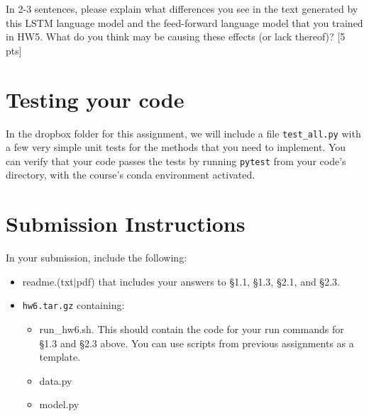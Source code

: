 \documentclass[11pt]{article}
\begin{document}
\vspace{2em}
 In 2-3 sentences, please explain what differences you see in the text generated by this LSTM language model and the feed-forward language model that you trained in HW5. What do you think may be causing these effects (or lack thereof)? \hfill [5 pts]

\section{Testing your code}

In the dropbox folder for this assignment, we will include a file \texttt{test\_all.py} with a few very simple unit tests for the methods that you need to implement.  You can verify that your code passes the tests by running \texttt{pytest} from your code's directory, with the course's conda environment activated.


\section*{Submission Instructions}

In your submission, include the following:
\begin{itemize}
  \item readme.(txt$\mid$pdf) that includes your answers to \S1.1, \S1.3, \S2.1, and \S2.3. 
  \item \texttt{hw6.tar.gz} containing:
  \begin{itemize}
    \item run\_hw6.sh.  This should contain the code for your run commands for \S1.3 and \S2.3 above.  You can use scripts from previous assignments as a template.
    \item data.py
    \item model.py
  \end{itemize}
\end{itemize}
\end{document}
